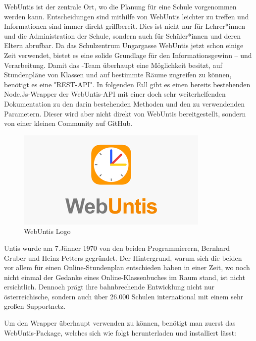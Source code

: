 

WebUntis ist der zentrale Ort, wo die Planung für eine Schule vorgenommen werden kann. Entscheidungen sind mithilfe von WebUntis leichter zu treffen und Informationen sind immer direkt griffbereit. Dies ist nicht nur für Lehrer*innen und die Administration der Schule, sondern auch für Schüler*innen und deren Eltern abrufbar. Da das Schulzentrum Ungargasse WebUntis jetzt schon einige Zeit verwendet, bietet es eine solide Grundlage für den Informationsgewinn – und Verarbeitung. Damit das \ZELIA-Team überhaupt eine Möglichkeit besitzt, auf Stundenpläne von Klassen und auf bestimmte Räume zugreifen zu können, benötigt es eine "REST-API". In folgenden Fall gibt es einen bereits bestehenden Node.Js-Wrapper der WebUntis-API mit einer doch sehr weiterhelfenden Dokumentation zu den darin bestehenden Methoden und den zu verwendenden Parametern. Dieser wird aber nicht direkt von WebUntis bereitgestellt, sondern von einer kleinen Community auf GitHub. \cite{WebUntisWrapper}

\begin{figure}[H]
    \centering
    \includegraphics{media/WebUntis/WebUntisLogo.png}
    \caption{WebUntis Logo\cite{WebUntisLogo}}
\end{figure}


Untis wurde am 7.Jänner 1970 von den beiden Programmierern, Bernhard Gruber und Heinz Petters gegründet. Der Hintergrund, warum sich die beiden vor allem für einen Online-Stundenplan entschieden haben in einer Zeit, wo noch nicht einmal der Gedanke eines Online-Klassenbuches im Raum stand, ist nicht ersichtlich. Dennoch prägt ihre bahnbrechende Entwicklung nicht nur österreichische, sondern auch über 26.000 Schulen international mit einem sehr großen Supportnetz. \cite{Untis}


Um den Wrapper überhaupt verwenden zu können, benötigt man zuerst das WebUntis-Package, welches sich wie folgt herunterladen und installiert lässt:



